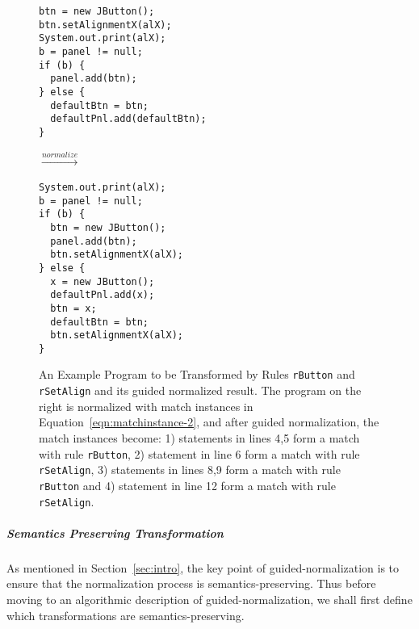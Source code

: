 \documentclass[a4paper, USenglish]{lipics-v2016}
\newenvironment{smpage}[1]
{\begin{lrbox}{\fmbox}\begin{minipage}{#1}}
{\end{minipage}\end{lrbox}\usebox{\fmbox}}
\newcommand{\code}[1]{\texttt{\footnotesize #1}}
\theoremstyle{plain}
\begin{document}
\begin{figure}[ht]
\vspace{-5pt}
\begin{center}
\begin{smpage}{0.34\columnwidth}
\begin{lstlisting}[style=patl,frame=none,basicstyle=\ttfamily\scriptsize]
btn = new JButton();
btn.setAlignmentX(alX);
System.out.print(alX);
b = panel != null;
if (b) {
  panel.add(btn);
} else {
  defaultBtn = btn;
  defaultPnl.add(defaultBtn);
}
\end{lstlisting}
\end{smpage}
\!\!\!\!\!\!$\xrightarrow{normalize}$~~~~~
\begin{smpage}{0.3\columnwidth}
\begin{lstlisting}[style=patl,frame=none,basicstyle=\ttfamily\scriptsize]
System.out.print(alX);
b = panel != null;
if (b) {
  btn = new JButton();
  panel.add(btn);
  btn.setAlignmentX(alX);
} else {
  x = new JButton();
  defaultPnl.add(x);
  btn = x;
  defaultBtn = btn;
  btn.setAlignmentX(alX);
}
\end{lstlisting}
\end{smpage}
\end{center}
\vspace{-15pt}
\caption{An Example Program to be Transformed by Rules \code{rButton} and
  \code{rSetAlign} and its guided normalized result. The program on the right is normalized with match instances in Equation~\ref{eqn:matchinstance-2}, and after guided normalization, the match instances become: 1) statements in lines 4,5 form a match with rule \code{rButton}, 2) statement in line 6 form a match with rule \code{rSetAlign}, 3) statements in lines 8,9 form a match with rule \code{rButton} and 4) statement in line 12 form a match with rule \code{rSetAlign}.}
\label{running-eg2-normalize}
\vspace{-10pt}
\end{figure}

\subparagraph*{Semantics Preserving Transformation} As mentioned in Section~\ref{sec:intro}, the key point of guided-normalization is to ensure that the normalization process is semantics-preserving. Thus before moving to an algorithmic description of guided-normalization, we shall first define which transformations are semantics-preserving.
\end{document}

